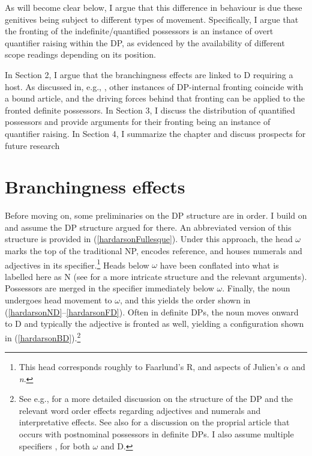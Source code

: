 \documentclass[output=paper,colorlinks,citecolor=brown,
]{langscibook}
\begin{document}
As will become clear below, I argue that this difference in behaviour is due these genitives being subject to different types of movement. Specifically, I argue that the fronting of the indefinite/quantified possessors is an instance of overt quantifier raising within the DP, as evidenced by the availability of different scope readings depending on its position.

In Section 2, I argue that the branchingness effects are linked to D requiring a host. As discussed in, e.g., \cite{Hardarson:2016wd}, other instances of DP-internal fronting coincide with a bound article, and the driving forces behind that fronting can be applied to the fronted definite possessors. In Section 3, I discuss the distribution of quantified possessors and provide arguments for their fronting being an instance of quantifier raising. In Section 4, I summarize the chapter and discuss prospects for future research

\section{Branchingness effects}
\label{hardarsonsec:branches}

Before moving on, some preliminaries on the DP structure are in order. I build on \cite{Hardarson:2016wd} and assume the DP structure argued for there. An abbreviated version of this structure is provided in (\ref{hardarsonFullesque}). Under this approach, the head $\omega$ marks the top of the traditional NP, encodes reference, and houses numerals and adjectives in its specifier.\footnote{This head corresponds roughly to Faarlund's \citeyearpar{Faarlund:2004,Faarlund:2009tq} R, and aspects of Julien's \citeyearpar{Julien:2003wu,Julien:2005wh} $\alpha$ and \textit{n}.} Heads below $\omega$ have been conflated into what is labelled here as N (see \citealt{Hardarson:2016wd} for a more intricate structure and the relevant arguments). Possessors are merged in the specifier immediately below $\omega$. Finally, the noun undergoes head movement to $\omega$, and this yields the order shown in (\ref{hardarsonND}--\ref{hardarsonFD}). Often in definite DPs, the noun moves onward to D and typically the adjective is fronted as well, yielding a configuration shown in (\ref{hardarsonBD}).\footnote{See e.g., \citep{Magnusson:1984ue,HAS:1993,Sigurdsson:2006wn,Pfaff:2015tp,Ingason:2016wv,Hardarson:2016wd} for a more detailed discussion on the structure of the DP and the relevant word order effects regarding adjectives and numerals and interpretative effects. See also \cite{Sigurdsson:2006wn} for a discussion on the proprial article that occurs with postnominal possessors in definite DPs. I also assume multiple specifiers \citep[e.g.,][]{Chomsky:1995uq,Lahne:2009va}, for both $\omega$ and D.}
\end{document}

